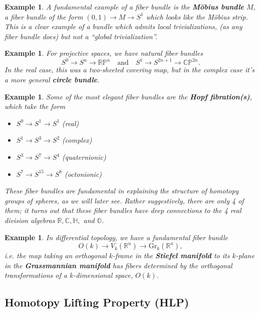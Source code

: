 \documentclass[12pt]{article}
\providecommand{\R}{\mathbb{R}}
\newtheorem{example}[definition]{Example}
\begin{document}
\begin{example}
  A fundamental example of a fiber bundle is the \textbf{M\"obius bundle} $M$, a fiber bundle of the form $(0,1) \to M \to S^1$ which looks like the M\"obius strip. This is a clear example of a bundle which admits local trivializations, (as any fiber bundle does) but not a ``global trivialization''.
\end{example}

\begin{example}
  For projective spaces, we have natural fiber bundles 
  \[S^0 \to S^n \to \mathbb{RP}^n \quad\textrm{and}\quad S^1 \to S^{2n+1} \to \mathbb{CP}^{2n}.\]
  In the real case, this was a two-sheeted covering map, but in the complex case it's a more general \textbf{circle bundle}.
\end{example}

\begin{example}
  Some of the most elegant fiber bundles are the \textbf{Hopf fibration(s)}, which take the form
  \begin{itemize}
    \item $S^0 \to S^1 \to S^1$ (real)
    \item $S^1 \to S^3 \to S^2$ (complex)
    \item $S^3 \to S^7 \to S^4$ (quaternionic)
    \item $S^7 \to S^{15} \to S^8$ (octonionic)
  \end{itemize}
  These fiber bundles are fundamental in explaining the structure of homotopy groups of spheres, as we will later see. Rather suggestively, there are only 4 of them; it turns out that these fiber bundles have deep connections to the 4 real division algebras $\mathbb{R}, \mathbb{C}, \mathbb{H},$ and $\mathbb{O}$.
\end{example}

\begin{example}
  In differential topology, we have a fundamental fiber bundle 
  \[O(k) \to V_k(\R^n) \to \mathrm{Gr}_k(\R^n),\]
  i.e. the map taking an orthogonal $k$-frame in the \textbf{Stiefel manifold} to its $k$-plane in the \textbf{Grassmannian manifold} has fibers determined by the orthogonal transformations of a $k$-dimensional space, $O(k)$.
\end{example}

\subsection{Homotopy Lifting Property (HLP)}
\end{document}
